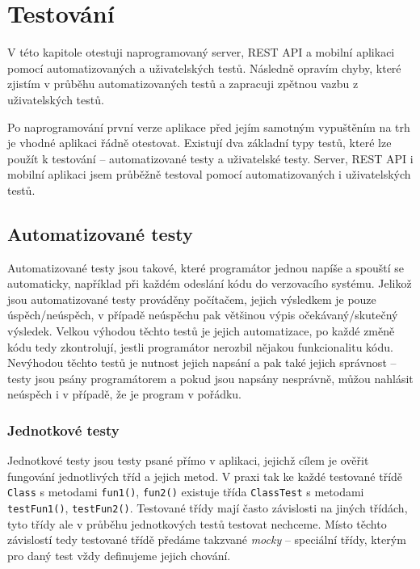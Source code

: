\chapter{Testování}
\label{testovani}

\begin{chapterabstract}
    V této kapitole otestuji naprogramovaný server, REST API a mobilní aplikaci pomocí automatizovaných a uživatelských testů. Následně opravím chyby, které zjistím v průběhu automatizovaných testů a zapracuji zpětnou vazbu z uživatelských testů.
\end{chapterabstract}

Po naprogramování první verze aplikace před jejím samotným vypuštěním na trh je vhodné aplikaci řádně otestovat. Existují dva základní typy testů, které lze použít k testování -- automatizované testy a uživatelské testy. Server, REST API i mobilní aplikaci jsem průběžně testoval pomocí automatizovaných i uživatelských testů.

\section{Automatizované testy}

Automatizované testy jsou takové, které programátor jednou napíše a spouští se automaticky, například při každém odeslání kódu do verzovacího systému. Jelikož jsou automatizované testy prováděny počítačem, jejich výsledkem je pouze úspěch/neúspěch, v případě neúspěchu pak většinou výpis očekávaný/skutečný výsledek. Velkou výhodou těchto testů je jejich automatizace, po každé změně kódu tedy zkontrolují, jestli programátor nerozbil nějakou funkcionalitu kódu. Nevýhodou těchto testů je nutnost jejich napsání a pak také jejich správnost -- testy jsou psány programátorem a pokud jsou napsány nesprávně, můžou nahlásit neúspěch i v případě, že je program v pořádku.

\subsection{Jednotkové testy}

Jednotkové testy jsou testy psané přímo v aplikaci, jejichž cílem je ověřit fungování jednotlivých tříd a jejich metod. V praxi tak ke každé testované třídě \texttt{Class} s metodami \texttt{fun1()}, \texttt{fun2()} existuje třída \texttt{ClassTest} s metodami \texttt{testFun1()}, \texttt{testFun2()}. Testované třídy mají často závislosti na jiných třídách, tyto třídy ale v průběhu jednotkových testů testovat nechceme. Místo těchto závislostí tedy testované třídě předáme takzvané \textit{mocky} -- speciální třídy, kterým pro daný test vždy definujeme jejich chování.

